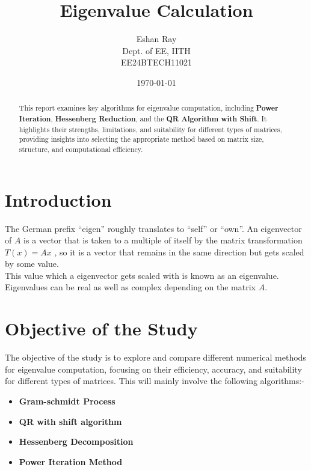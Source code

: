 \documentclass[12pt]{article}
\title{Eigenvalue Calculation}
\author{Eshan Ray \\
        Dept. of EE, IITH \\
        EE24BTECH11021}
\date{\today}  %
\begin{document}
\maketitle

\begin{abstract}
    This report examines key algorithms for eigenvalue computation, including \textbf{Power Iteration}, \textbf{Hessenberg Reduction}, and the \textbf{QR Algorithm with Shift}. It highlights their strengths, limitations, and suitability for different types of matrices, providing insights into selecting the appropriate method based on matrix size, structure, and computational efficiency.
\end{abstract}

\tableofcontents
\newpage

\section{Introduction}
The German prefix “eigen” roughly translates to “self” or “own”. An eigenvector of
$A$ is a vector that is taken to a multiple of itself by the matrix transformation $T(x) = Ax$ ,
so it is a vector that remains in the same direction but gets scaled by some value. \\
This value which a eigenvector gets scaled with is known as an eigenvalue.\\
Eigenvalues can be real as well as complex depending on the matrix $A$.

\section{Objective of the Study}
The objective of the study is to explore and compare different numerical methods for eigenvalue computation, focusing on their efficiency, accuracy, and suitability for different types of matrices. This will mainly involve the following algorithms:-
\begin{itemize}
    \item \textbf{Gram-schmidt Process}
    \item \textbf{QR with shift algorithm}
    \item \textbf{Hessenberg Decomposition}
    \item \textbf{Power Iteration Method}
\end{itemize}
    
\end{document}
